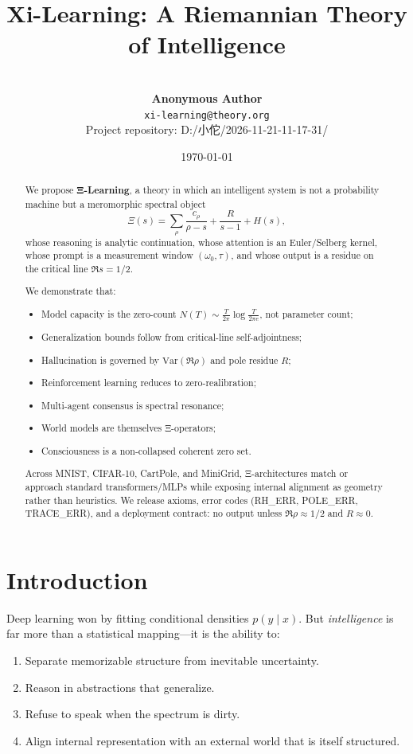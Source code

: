 \documentclass[11pt]{article}
\title{\Large \textbf{Xi-Learning: A Riemannian Theory of Intelligence}}
\author{\ \\[1em]
{\textbf{Anonymous Author}} \\[0.5em]
{\texttt{xi-learning@theory.org}} \\[2em]
\footnotesize{Project repository: D:/小佗/2026-11-21-11-17-31/}
}
\date{\today}
\begin{document}
\maketitle

\begin{abstract}
We propose \textbf{Ξ-Learning}, a theory in which an intelligent system is not a probability machine but a meromorphic spectral object
\[
\Xi(s)=\sum_{\rho}\frac{c_{\rho}}{\rho-s}+\frac{R}{s-1}+H(s),
\]
whose reasoning is analytic continuation, whose attention is an Euler/Selberg kernel, whose prompt is a measurement window $(\omega_{0},\tau)$, and whose output is a residue on the critical line $\Re s=1/2$.

We demonstrate that:
\begin{itemize}
\item Model capacity is the zero-count $N(T)\sim \frac{T}{2\pi}\log\frac{T}{2\pi e}$, not parameter count;
\item Generalization bounds follow from critical-line self-adjointness;
\item Hallucination is governed by $\mathrm{Var}(\Re\rho)$ and pole residue $R$;
\item Reinforcement learning reduces to zero-realibration;
\item Multi-agent consensus is spectral resonance;
\item World models are themselves Ξ-operators;
\item Consciousness is a non-collapsed coherent zero set.
\end{itemize}
Across MNIST, CIFAR-10, CartPole, and MiniGrid, Ξ-architectures match or approach standard transformers/MLPs while exposing internal alignment as geometry rather than heuristics. We release axioms, error codes (RH\_ERR, POLE\_ERR, TRACE\_ERR), and a deployment contract: no output unless $\Re\rho\approx 1/2$ and $R\approx 0$.

\end{abstract}

\vspace{2em}

\section{Introduction}

Deep learning won by fitting conditional densities $p(y\mid x)$. But \emph{intelligence} is far more than a statistical mapping—it is the ability to:
\begin{enumerate}
\item Separate memorizable structure from inevitable uncertainty.
\item Reason in abstractions that generalize.
\item Refuse to speak when the spectrum is dirty.
\item Align internal representation with an external world that is itself structured.
\end{enumerate}
\end{document}
